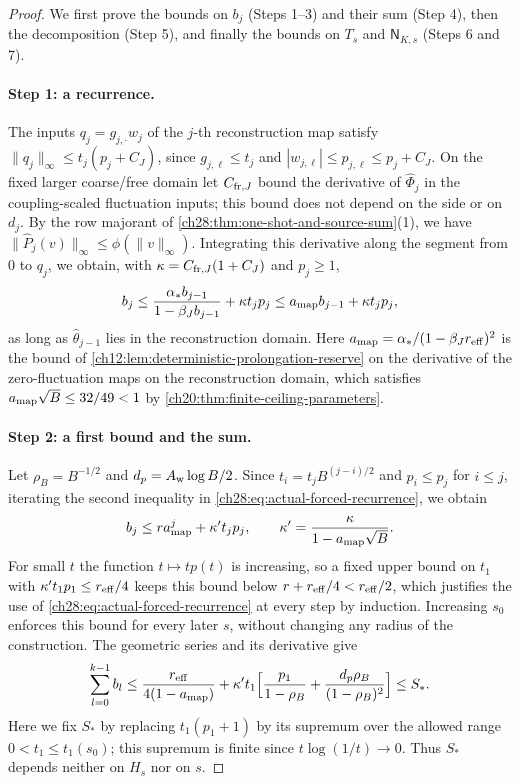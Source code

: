 \begin{proof}
We first prove the bounds on $b_j$ (Steps 1--3) and their sum (Step 4), then the decomposition (Step 5), and finally the bounds on $T_s$ and $\mathsf N_{K,s}$ (Steps 6 and 7).

\paragraph{Step 1: a recurrence.}
The inputs $q_j=g_{j,\cdot}w_j$ of the $j$-th reconstruction map satisfy $\|q_j\|_\infty\le t_j(p_j+C_J)$, since $g_{j,\ell}\le t_j$ and $|w_{j,\ell}|\le p_{j,\ell}\le p_j+C_J$. On the fixed larger coarse/free domain let $C_{{\rm fr},J}$ bound the derivative of $\widehat\Phi_j$ in the coupling-scaled fluctuation inputs; this bound does not depend on the side or on $d_j$. By the row majorant of \cref{ch28:thm:one-shot-and-source-sum}(1), we have $\|\widehat P_j(v)\|_\infty\le\phi(\|v\|_\infty)$. Integrating this derivative along the segment from $0$ to $q_j$, we obtain, with $\kappa=C_{{\rm fr},J}(1+C_J)$ and $p_j\ge1$,
\begin{equation}\label{ch28:eq:actual-forced-recurrence}
 b_j\le\frac{\alpha_*b_{j-1}}{1-\beta_Jb_{j-1}}+\kappa t_jp_j\le a_{\rm map}b_{j-1}+\kappa t_jp_j,
\end{equation}
as long as $\widehat\theta_{j-1}$ lies in the reconstruction domain. Here $a_{\rm map}=\alpha_*/(1-\beta_Jr_{\rm eff})^2$ is the bound of \cref{ch12:lem:deterministic-prolongation-reserve} on the derivative of the zero-fluctuation maps on the reconstruction domain, which satisfies $a_{\rm map}\sqrt B\le32/49<1$ by \cref{ch20:thm:finite-ceiling-parameters}.

\paragraph{Step 2: a first bound and the sum.}
Let $\rho_B=B^{-1/2}$ and $d_p=A_{\rm w}\log B/2$. Since $t_i=t_jB^{(j-i)/2}$ and $p_i\le p_j$ for $i\le j$, iterating the second inequality in \eqref{ch28:eq:actual-forced-recurrence}, we obtain
\[
 b_j\le ra_{\rm map}^j+\kappa't_jp_j,\qquad \kappa'=\frac\kappa{1-a_{\rm map}\sqrt B}.
\]
For small $t$ the function $t\mapsto tp(t)$ is increasing, so a fixed upper bound on $t_1$ with $\kappa't_1p_1\le r_{\rm eff}/4$ keeps this bound below $r+r_{\rm eff}/4<r_{\rm eff}/2$, which justifies the use of \eqref{ch28:eq:actual-forced-recurrence} at every step by induction. Increasing $s_0$ enforces this bound for every later $s$, without changing any radius of the construction. The geometric series and its derivative give
\[
 \sum_{l=0}^{k-1}b_l\le\frac{r_{\rm eff}}{4(1-a_{\rm map})}+\kappa't_1\Bigl[\frac{p_1}{1-\rho_B}+\frac{d_p\rho_B}{(1-\rho_B)^2}\Bigr]\le S_*.
\]
Here we fix $S_*$ by replacing $t_1(p_1+1)$ by its supremum over the allowed range $0<t_1\le t_1(s_0)$; this supremum is finite since $t\log(1/t)\to0$. Thus $S_*$ depends neither on $H_s$ nor on $s$.


\end{proof}
